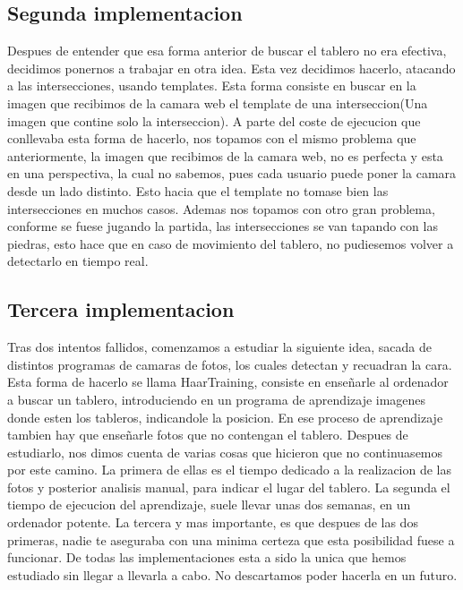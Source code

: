 \documentclass[12pt,a4paper]{report}
\begin{document}
\subsection{Segunda implementacion}

Despues de entender que esa forma anterior de buscar el tablero no era efectiva, decidimos ponernos a trabajar en otra idea. Esta vez decidimos hacerlo, atacando a las intersecciones, usando templates.
Esta forma consiste en buscar en la imagen que recibimos de la camara web el template de una interseccion(Una imagen que contine solo la interseccion).
A parte del coste de ejecucion que conllevaba esta forma de hacerlo, nos topamos con el mismo problema que anteriormente, la imagen que recibimos de la camara web, no es perfecta y esta en una perspectiva, la cual no sabemos, pues cada usuario puede poner la camara desde un lado distinto. Esto hacia que el template no tomase bien las intersecciones en muchos casos.
Ademas nos topamos con otro gran problema, conforme se fuese jugando la partida, las intersecciones se van tapando con las piedras, esto hace que en caso de movimiento del tablero, no pudiesemos volver a detectarlo en tiempo real.


\subsection{Tercera implementacion}

Tras dos intentos fallidos, comenzamos a estudiar la siguiente idea, sacada de distintos programas de camaras de fotos, los cuales detectan y recuadran la cara. 
Esta forma de hacerlo se llama HaarTraining, consiste en enseñarle al ordenador a buscar un tablero, introduciendo en un programa de aprendizaje imagenes donde esten los tableros, indicandole la posicion. En ese proceso de aprendizaje tambien hay que enseñarle fotos que no contengan el tablero.
Despues de estudiarlo, nos dimos cuenta de varias cosas que hicieron que no continuasemos por este camino.
La primera de ellas es el tiempo dedicado a la realizacion de las fotos y posterior analisis manual, para indicar el lugar del tablero.
La segunda el tiempo de ejecucion del aprendizaje, suele llevar unas dos semanas, en un ordenador potente.
La tercera y mas importante, es que despues de las dos primeras, nadie te aseguraba con una minima certeza que esta posibilidad fuese a funcionar.
De todas las implementaciones esta a sido la unica que hemos estudiado sin llegar a llevarla a cabo. No descartamos poder hacerla en un futuro.
\end{document}
